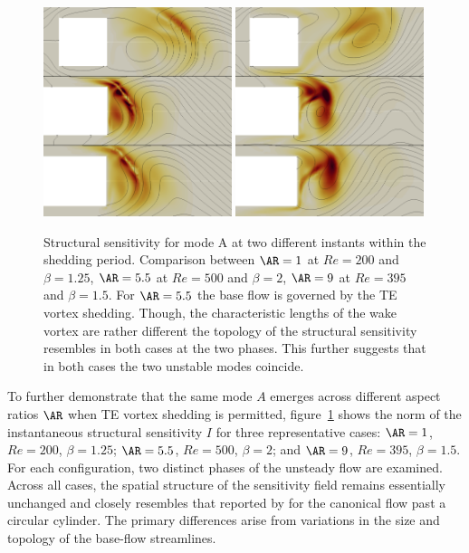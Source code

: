\begin{figure}
  \centering
  \includegraphics[width=0.49\textwidth]{./fig/AR5p5/sens_1-200-1p25_5p5-500-2_9-395_1p5_modeA_75.png}
  \includegraphics[width=0.49\textwidth]{./fig/AR5p5/sens_1-200-1p25_5p5-500-2_9-395_1p5_modeA_100.png}
  \caption{Structural sensitivity for mode A at two different instants within the shedding period. Comparison between $\AR=1$ at $Re=200$ and $\beta=1.25$, $\AR=5.5$ at $Re=500$ and $\beta=2$, $\AR=9$ at $Re=395$ and $\beta=1.5$. For $\AR=5.5$ the base flow is governed by the TE vortex shedding. Though, the characteristic lengths of the wake vortex are rather different the topology of the structural sensitivity resembles in both cases at the two phases. This further suggests that in both cases the two unstable modes coincide.}
  \label{fig:sens_modeA}
\end{figure}
%
To further demonstrate that the same mode $A$ emerges across different aspect ratios $\AR$ when TE vortex shedding is permitted, figure~\ref{fig:sens_modeA} shows the norm of the instantaneous structural sensitivity $I$ for three representative cases: $\AR = 1$, $Re = 200$, $\beta = 1.25$; $\AR = 5.5$, $Re = 500$, $\beta = 2$; and $\AR = 9$, $Re = 395$, $\beta = 1.5$. For each configuration, two distinct phases of the unsteady flow are examined. Across all cases, the spatial structure of the sensitivity field remains essentially unchanged and closely resembles that reported by \cite{giannetti-camarri-luchini-2010} for the canonical flow past a circular cylinder. The primary differences arise from variations in the size and topology of the base-flow streamlines.
